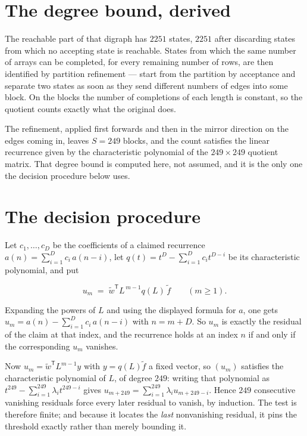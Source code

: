 \documentclass[11pt]{article}
\theoremstyle{definition}
\begin{document}
\section{The degree bound, derived}

The reachable part of that digraph has $2251$ states, $2251$ after discarding states from which no accepting state is reachable. States from which the same number of arrays can be completed, for every remaining number of rows, are then identified by partition refinement --- start from the partition by acceptance and separate two states as soon as they send different numbers of edges into some block. On the blocks the number of completions of each length is constant, so the quotient counts exactly what the original does.

The refinement, applied first forwards and then in the mirror direction on the edges coming in, leaves $S = 249$ blocks, and the count satisfies the linear recurrence given by the characteristic polynomial of the $249 \times 249$ quotient matrix. That degree bound is computed here, not assumed, and it is the only one the decision procedure below uses.

\section{The decision procedure}

Let $c_1,\dots,c_D$ be the coefficients of a claimed recurrence $a(n) = \sum_{i=1}^{D} c_i\,a(n-i)$, let $q(t) = t^{D} - \sum_{i=1}^{D} c_i t^{D-i}$ be its characteristic polynomial, and put

\[u_m \;=\; \tilde w^{\mathsf T} L^{\,m-1} q(L)\,\tilde f \qquad (m \ge 1).\]

Expanding the powers of $L$ and using the displayed formula for $a$, one gets $u_m = a(n) - \sum_{i=1}^{D} c_i\,a(n-i)$ with $n = m + D$. So $u_m$ is exactly the residual of the claim at that index, and the recurrence holds at an index $n$ if and only if the corresponding $u_m$ vanishes.

Now $u_m = \tilde w^{\mathsf T} L^{m-1} y$ with $y = q(L)\tilde f$ a fixed vector, so $(u_m)$ satisfies the characteristic polynomial of $L$, of degree $249$: writing that polynomial as $t^{249} - \sum_{i=1}^{249} \lambda_i t^{249-i}$ gives $u_{m+249} = \sum_{i=1}^{249} \lambda_i u_{m+249-i}$. Hence $249$ consecutive vanishing residuals force every later residual to vanish, by induction. The test is therefore finite; and because it locates the {\itshape last} nonvanishing residual, it pins the threshold exactly rather than merely bounding it.
\end{document}
